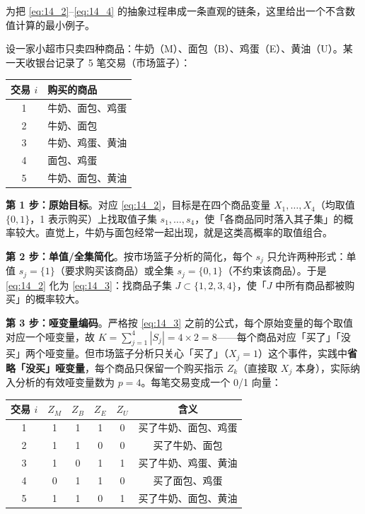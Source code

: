 \begin{example}[市场篮子问题的完整流程演示]
为把 \eqref{eq:14_2}--\eqref{eq:14_4} 的抽象过程串成一条直观的链条，这里给出一个不含数值计算的最小例子。

设一家小超市只卖四种商品：牛奶（M）、面包（B）、鸡蛋（E）、黄油（U）。某一天收银台记录了 5 笔交易（市场篮子）：
\begin{center}
\begin{tabular}{cl}
\toprule
交易 $i$ & 购买的商品 \\
\midrule
1 & 牛奶、面包、鸡蛋 \\
2 & 牛奶、面包 \\
3 & 牛奶、鸡蛋、黄油 \\
4 & 面包、鸡蛋 \\
5 & 牛奶、面包、黄油 \\
\bottomrule
\end{tabular}
\end{center}

\textbf{第 1 步：原始目标}。对应 \eqref{eq:14_2}，目标是在四个商品变量 $X_1,\dots,X_4$（均取值 $\{0,1\}$，1 表示购买）上找取值子集 $s_1,\dots,s_4$，使「各商品同时落入其子集」的概率较大。直觉上，牛奶与面包经常一起出现，就是这类高概率的取值组合。

\textbf{第 2 步：单值/全集简化}。按市场篮子分析的简化，每个 $s_j$ 只允许两种形式：单值 $s_j=\{1\}$（要求购买该商品）或全集 $s_j=\{0,1\}$（不约束该商品）。于是 \eqref{eq:14_2} 化为 \eqref{eq:14_3}：找商品子集 $J\subset\{1,2,3,4\}$，使「$J$ 中所有商品都被购买」的概率较大。

\textbf{第 3 步：哑变量编码}。严格按 \eqref{eq:14_3} 之前的公式，每个原始变量的每个取值对应一个哑变量，故 $K=\sum_{j=1}^{4}|S_j|=4\times 2=8$——每个商品对应「买了」「没买」两个哑变量。但市场篮子分析只关心「买了」（$X_j=1$）这个事件，实践中\textbf{省略「没买」哑变量}，每个商品只保留一个购买指示 $Z_k$（直接取 $X_j$ 本身），实际纳入分析的有效哑变量数为 $p=4$。每笔交易变成一个 0/1 向量：
\begin{center}
\begin{tabular}{cccccc}
\toprule
交易 $i$ & $Z_M$ & $Z_B$ & $Z_E$ & $Z_U$ & 含义 \\
\midrule
1 & 1 & 1 & 1 & 0 & 买了牛奶、面包、鸡蛋 \\
2 & 1 & 1 & 0 & 0 & 买了牛奶、面包 \\
3 & 1 & 0 & 1 & 1 & 买了牛奶、鸡蛋、黄油 \\
4 & 0 & 1 & 1 & 0 & 买了面包、鸡蛋 \\
5 & 1 & 1 & 0 & 1 & 买了牛奶、面包、黄油 \\
\bottomrule
\end{tabular}
\end{center}


\end{example}
